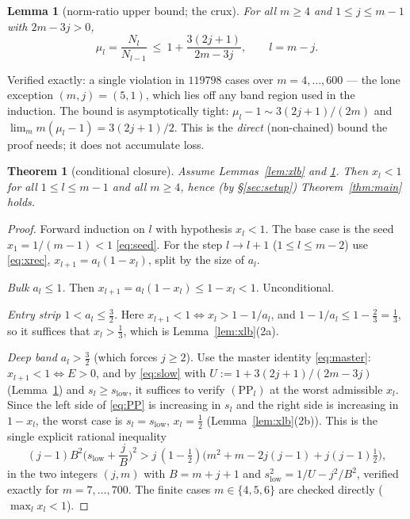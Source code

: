 \documentclass[11pt]{article}
\newtheorem{theorem}{Theorem}
\newtheorem{lemma}{Lemma}
\theoremstyle{definition}
\begin{document}
\begin{lemma}[norm-ratio upper bound; the crux]\label{lem:muub}
For all $m\ge4$ and $1\le j\le m-1$ with $2m-3j>0$,
\begin{equation}\label{eq:muub}
  \mu_l=\frac{N_l}{N_{l-1}}\ \le\ 1+\frac{3(2j+1)}{2m-3j},
  \qquad l=m-j .
\end{equation}
\end{lemma}
\noindent Verified exactly: a single violation in $119798$ cases over
$m=4,\dots,600$ --- the lone exception $(m,j)=(5,1)$, which lies off any
band region used in the induction.  The bound is asymptotically tight:
$\mu_l-1\sim3(2j+1)/(2m)$ and $\lim_m m(\mu_l-1)=3(2j+1)/2$.  This is the
\emph{direct} (non-chained) bound the proof needs; it does not accumulate
loss.

\begin{theorem}[conditional closure]\label{thm:closure}
Assume Lemmas~\ref{lem:xlb} and \ref{lem:muub}.  Then $x_l<1$ for all
$1\le l\le m-1$ and all $m\ge4$, hence (by \S\ref{sec:setup})
Theorem~\ref{thm:main} holds.
\end{theorem}
\begin{proof}
Forward induction on $l$ with hypothesis $x_l<1$.  The base case is the
seed $x_1=1/(m-1)<1$ \eqref{eq:seed}.  For the step $l\to l+1$
($1\le l\le m-2$) use \eqref{eq:xrec}, $x_{l+1}=a_l(1-x_l)$, split by the
size of $a_l$.

\smallskip\noindent\emph{Bulk $a_l\le1$.}  Then
$x_{l+1}=a_l(1-x_l)\le1-x_l<1$.  Unconditional.

\smallskip\noindent\emph{Entry strip $1<a_l\le\tfrac32$.}  Here
$x_{l+1}<1\iff x_l>1-1/a_l$, and $1-1/a_l\le1-\tfrac23=\tfrac13$, so it
suffices that $x_l>\tfrac13$, which is Lemma~\ref{lem:xlb}(2a).

\smallskip\noindent\emph{Deep band $a_l>\tfrac32$} (which forces
$j\ge2$).  Use the master identity \eqref{eq:master}: $x_{l+1}<1\iff E>0$,
and by \eqref{eq:slow} with $U:=1+3(2j+1)/(2m-3j)$ (Lemma~\ref{lem:muub})
and $s_l\ge s_{\mathrm{low}}$, it suffices to verify $(\mathrm{PP}_l)$ at
the worst admissible $x_l$.  Since the left side of \eqref{eq:PP} is
increasing in $s_l$ and the right side is increasing in $1-x_l$, the worst
case is $s_l=s_{\mathrm{low}}$, $x_l=\tfrac12$ (Lemma~\ref{lem:xlb}(2b)).
This is the single explicit rational inequality
\begin{equation}\label{eq:final}
  (j-1)B^2\Big(s_{\mathrm{low}}+\frac jB\Big)^2
  > j\,(1-\tfrac12)\Big(m^2+m-2j(j-1)+j(j-1)\tfrac12\Big),
\end{equation}
in the two integers $(j,m)$ with $B=m+j+1$ and
$s_{\mathrm{low}}^2=1/U-j^2/B^2$, verified exactly for $m=7,\dots,700$.
The finite cases $m\in\{4,5,6\}$ are checked directly ($\max_l x_l<1$).
\end{proof}
\end{document}
